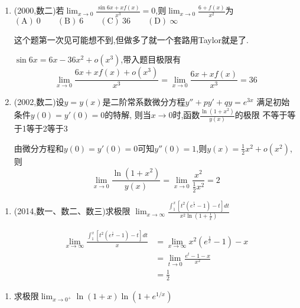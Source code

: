 \documentclass[12pt, a4paper, oneside, UTF8]{ctexbook}
\begin{document}
\begin{enumerate}[label=\arabic*.,start=4]
    \item  (2000,数二)若$\displaystyle \lim_{x\to0}\frac{\sin6x+xf(x)}{x^3}=0$,则$\displaystyle \lim_{x\to0}\frac{6+f(x)}{x^2}$为 \\
    $(\text{A}) \ 0 \qquad (\text{B})\ 6 \qquad (\text{C})\ 36 \qquad (\text{D})\ \infty$
    
    \begin{solution}
    这个题第一次见可能想不到,但做多了就一个套路用Taylor就是了.

    $\sin{6x}=6x-36x^2+o(x^3)$,带入题目极限有
    \[
    \lim_{x\to 0}\frac{6x+xf(x)+o(x^3)}{x^3} = \lim_{x\to 0}\frac{6x+xf(x)}{x^3} = 36
    \]
    \end{solution}
    
    \item  (2002,数二)设$y=y(x)$是二阶常系数微分方程$y''+py'+qy=e^{3x}$
    满足初始条件$y(0)=y'(0)=0$的特解,
    则当$x\to0$时,函数$\frac{\ln(1+x^2)}{y(x)}$的极限
    \newline
    不等于\qquad {}等于1\qquad {}等于2\qquad {}等于3
    
    \begin{solution}
    由微分方程和$y(0)=y'(0)=0$可知$y''(0)=1$,则$y(x)=\frac{1}{2}x^2+o(x^2)$,则
    \[
    \lim_{x\to 0}\frac{\ln(1+x^2)}{y(x)} = \lim_{x\to 0}\frac{x^2}{\frac{1}{2}x^2} = 2
    \]
    \end{solution}
\end{enumerate}

\begin{enumerate}[label=\arabic*.,start=6]
    \item  (2014,数一、数二、数三)求极限
    $
    \lim_{x\to \infty}\frac{\int_{1}^{x}\left[t^2(e^{\frac{1}{t}} - 1) - t\right]dt}
    {x^2\ln{(1+\frac{1}{x})}}
    $
    \begin{solution}
    \begin{align*}
        \lim_{x\to \infty}\frac{\int_{1}^{x}\left[t^2(e^{\frac{1}{t}} - 1) - t\right]dt}
        {x} &= \lim_{x\to \infty} x^2(e^{\frac{1}{x}}-1)-x \\
        & =\lim_{t\to 0}\frac{e^t-1-x}{x^2} \\
        & = \frac{1}{2}
    \end{align*}
    \end{solution}
\end{enumerate}

\begin{enumerate}[label=\arabic*.,start=7]
    \item  求极限$\lim_{x\to0^+}\ln(1+x)\ln\left(1+e^{1/x}\right)$
    
    \begin{solution}
    
    \end{solution}
\end{enumerate}
\end{document}
